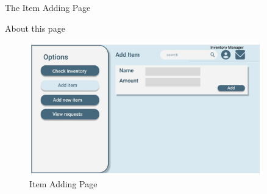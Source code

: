 \documentclass[20pt]{beamer}
\numberwithin{figure}{section}
\begin{document}
\begin{frame}{The Item Adding Page }

    \begin{block}{About this page}

    \vspace{10}


    \vspace{10}

    \end{block}

    \begin{figure}
        \centering
        \includegraphics[width= 0.9\textwidth , height= 0.5\paperheight]{InventoryManagerAddItemUI.png}
        \caption{Item Adding Page}
        \label{fig:61}
    \end{figure}

\end{frame}
\end{document}
